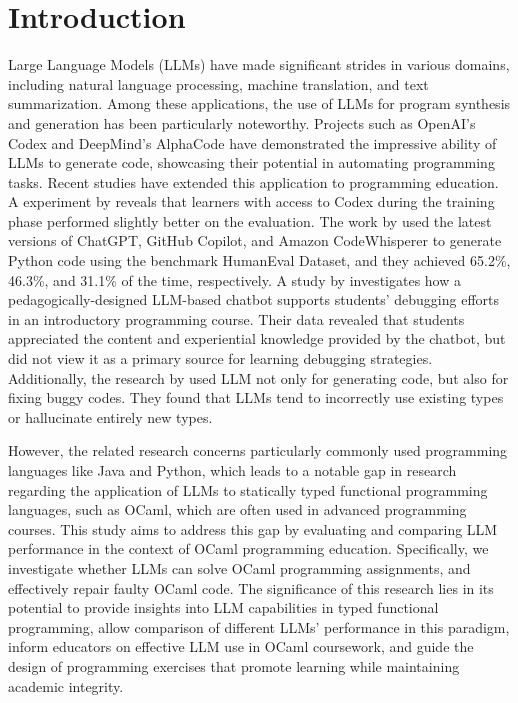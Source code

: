 \documentclass[sigconf,authordraft]{acmart}
\begin{document}
\section{Introduction}

Large Language Models (LLMs) have made significant strides in various domains, including natural language processing, machine translation, and text summarization. Among these applications, the use of LLMs for program synthesis and generation has been particularly noteworthy. Projects such as OpenAI's Codex and DeepMind's AlphaCode have demonstrated the impressive ability of LLMs to generate code, showcasing their potential in automating programming tasks. Recent studies have extended this application to programming education. A experiment by \cite{6:3:380} reveals that learners with access to Codex during the training phase performed slightly better on the evaluation.
The work by \cite{1555162} used the latest versions of ChatGPT, GitHub Copilot, and Amazon CodeWhisperer to generate Python code using the benchmark HumanEval Dataset, and they achieved 65.2\%, 46.3\%, and 31.1\% of the time, respectively. A study by \cite{2004:ITE:1009386.1010128} investigates how a pedagogically-designed LLM-based chatbot supports students’ debugging efforts in an introductory programming course. Their data revealed that students appreciated the content and experiential knowledge provided by the chatbot, but did not view it as a primary source for learning debugging strategies. Additionally, the research by \cite{6:1:1} used LLM not only for generating code, but also for fixing buggy codes. They found that LLMs tend to incorrectly use existing types or hallucinate entirely new types.



However, the related research concerns particularly commonly used programming languages like Java and Python, which leads to a notable gap in research regarding the application of LLMs to statically typed functional programming languages, such as OCaml, which are often used in advanced programming courses. This study aims to address this gap by evaluating and comparing LLM performance in the context of OCaml programming education. Specifically, we investigate whether LLMs can solve OCaml programming assignments, and effectively repair faulty OCaml code. The significance of this research lies in its potential to provide insights into LLM capabilities in typed functional programming, allow comparison of different LLMs' performance in this paradigm, inform educators on effective LLM use in OCaml coursework, and guide the design of programming exercises that promote learning while maintaining academic integrity.
\end{document}
